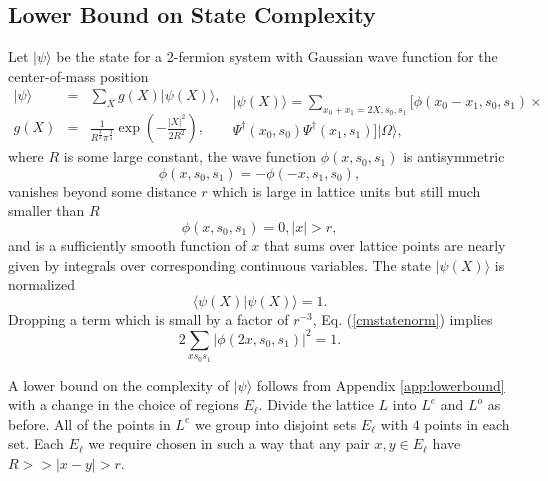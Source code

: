 \documentclass[12pt,amsmath,amssymb,onecolumn]{revtex4-2}
\begin{document}
\subsection{\label{sec:lowerboundnew} Lower Bound on State Complexity}

Let $|\psi \rangle $ be the state for a 2-fermion system with Gaussian wave function for the center-of-mass position 
\begin{subequations}
\begin{eqnarray}
\label{netstate}
|\psi \rangle  &=& \sum_X g(X)|\psi(X) \rangle , \\
\label{gaussianstate}
g(X) &=&  \frac{1}{R^\frac{3}{2} \pi^\frac{3}{4}} \exp( -\frac{|X|^2}{2R^2}), 
\end{eqnarray}
\begin{multline}
\label{cmstate}
|\psi(X) \rangle  =  \sum_{x_0 + x_1 = 2X, s_0, s_1}[ \phi(x_0 - x_1, s_0, s_1) \times \\
 \Psi^\dagger( x_0, s_0) \Psi^\dagger(x_1, s_1)] |\Omega \rangle ,
\end{multline}
\end{subequations}
where $R$ is some large constant,
the wave function $\phi(x, s_0, s_1)$ is antisymmetric
\begin{equation}
\label{antisymm}
\phi( x, s_0, s_1) = -\phi( -x, s_1, s_0),
\end{equation}
vanishes beyond some distance
$r$ which is large in lattice units but still much smaller than $R$
\begin{equation}
\label{range}
\phi( x, s_0, s_1) = 0, |x| > r, 
\end{equation}
and is a sufficiently smooth function of $x$ that 
sums over
lattice points are nearly given by integrals over corresponding
continuous variables.
The state $|\psi(X) \rangle $ is normalized
\begin{equation}
\label{cmstatenorm}
 \langle  \psi( X) | \psi( X) \rangle  = 1.
\end{equation}
Dropping a term which is small by a factor of $r^{-3}$, Eq. (\ref{cmstatenorm}) implies
\begin{equation}
\label{cmstatenorm1}
2 \sum_{x s_0 s_1} |\phi(2 x, s_0, s_1)|^2 = 1.
\end{equation}



A lower bound on the complexity of $|\psi \rangle $ follows from Appendix \ref{app:lowerbound} 
with a change in the choice of regions $E_\ell$. Divide the lattice $L$ into $L^e$
and $L^o$ as before. All of the points in $L^e$ we group into disjoint sets $E_\ell$ with $4$ points
in each set. Each $E_\ell$ we require chosen in such a way that any pair $x, y \in E_\ell$ have
$R >> |x - y| > r$. 
\end{document}
